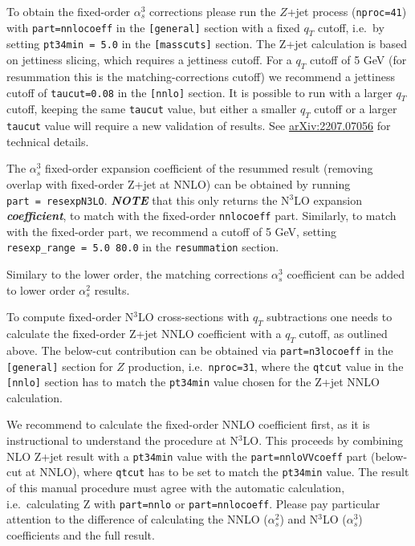 
To obtain the fixed-order $\alpha_s^3$ corrections please run the
$Z$+jet process (\texttt{nproc=41}) with \texttt{part=nnlocoeff} in
the \texttt{{[}general{]}} section with a fixed $q_T$ cutoff, i.e.~by
setting \texttt{pt34min\ =\ 5.0} in the \texttt{{[}masscuts{]}} section.
The Z+jet calculation is based on jettiness slicing, which requires a
jettiness cutoff. For a $q_T$ cutoff of 5 GeV (for resummation this is
the matching-corrections cutoff) we recommend a jettiness cutoff of
\texttt{taucut=0.08} in the \texttt{{[}nnlo{]}} section. It is possible
to run with a larger $q_T$ cutoff, keeping the same \texttt{taucut}
value, but either a smaller $q_T$ cutoff or a larger \texttt{taucut}
value will require a new validation of results. See
\href{https://arxiv.org/abs/2207.07056}{arXiv:2207.07056} for technical
details.



The $\alpha_s^3$ fixed-order expansion coefficient of the resummed
result (removing overlap with fixed-order Z+jet at NNLO) can be obtained
by running \texttt{part\ =\ resexpN3LO}. \textbf{\emph{NOTE}} that this
only returns the N$^3$LO expansion \textbf{\emph{coefficient}}, to
match with the fixed-order \texttt{nnlocoeff} part. Similarly, to match
with the fixed-order part, we recommend a cutoff of 5 GeV, setting
\texttt{resexp\_range\ =\ 5.0\ 80.0} in the \texttt{resummation}
section.


Similary to the lower order, the matching corrections $\alpha_s^3$
coefficient can be added to lower order $\alpha_s^2$ results.


To compute fixed-order N$^3$LO cross-sections with $q_T$
subtractions one needs to calculate the fixed-order Z+jet NNLO
coefficient with a $q_T$ cutoff, as outlined above. The below-cut
contribution can be obtained via \texttt{part=n3locoeff} in the
\texttt{{[}general{]}} section for $Z$ production,
i.e.~\texttt{nproc=31}, where the \texttt{qtcut} value in the
\texttt{{[}nnlo{]}} section has to match the \texttt{pt34min} value
chosen for the Z+jet NNLO calculation.

We recommend to calculate the fixed-order NNLO coefficient first, as it
is instructional to understand the procedure at N$^3$LO. This proceeds
by combining NLO Z+jet result with a \texttt{pt34min} value with the
\texttt{part=nnloVVcoeff} part (below-cut at NNLO), where \texttt{qtcut}
has to be set to match the \texttt{pt34min} value. The result of this
manual procedure must agree with the automatic calculation,
i.e.~calculating Z with \texttt{part=nnlo} or \texttt{part=nnlocoeff}.
Please pay particular attention to the difference of calculating the
NNLO ($\alpha_s^2$) and N$^3$LO ($\alpha_s^3$) coefficients and
the full result.

